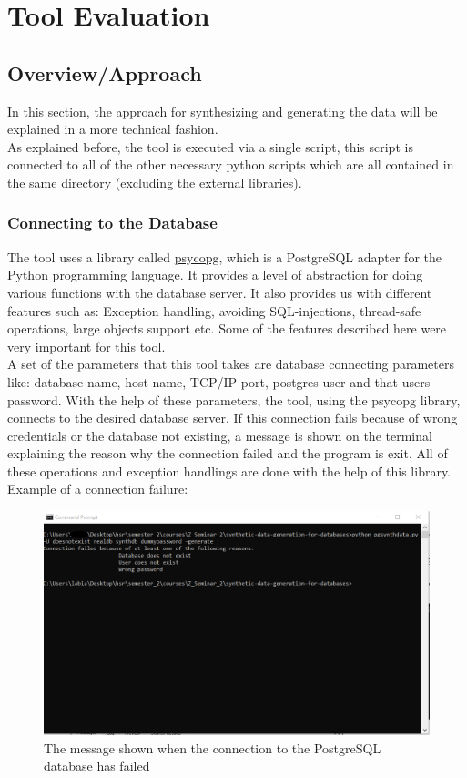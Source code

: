 \chapter{Tool Evaluation}
\section{Overview/Approach}
In this section, the approach for synthesizing and generating the data will be explained in a more technical fashion.\\
As explained before, the tool is executed via a single script, this script is connected to all of the other necessary python scripts which are all contained in the same directory (excluding the external libraries).
\subsection{Connecting to the Database}
The tool uses a library called \href{https://www.psycopg.org/}{psycopg}, which is a PostgreSQL adapter for the Python programming language. It provides a level of abstraction for doing various functions with the database server. It also provides us with different features such as: Exception handling, avoiding SQL-injections, thread-safe operations, large objects support etc. Some of the features described here were very important for this tool.\\
\newline
A set of the parameters that this tool takes are database connecting parameters like: database name, host name, TCP/IP port, postgres user and that users password. With the help of these parameters, the tool, using the psycopg library, connects to the desired database server. If this connection fails because of wrong credentials or the database not existing, a message is shown on the terminal explaining the reason why the connection failed and the program is exit. All of these operations and exception handlings are done with the help of this library.\\
\newpage
Example of a connection failure:
\begin{figure}[H]
	\includegraphics[width=\linewidth]{./Figures/ToolEvaluation/connection_failure_message.png}
	\caption{The message shown when the connection to the PostgreSQL database has failed}
\end{figure}
